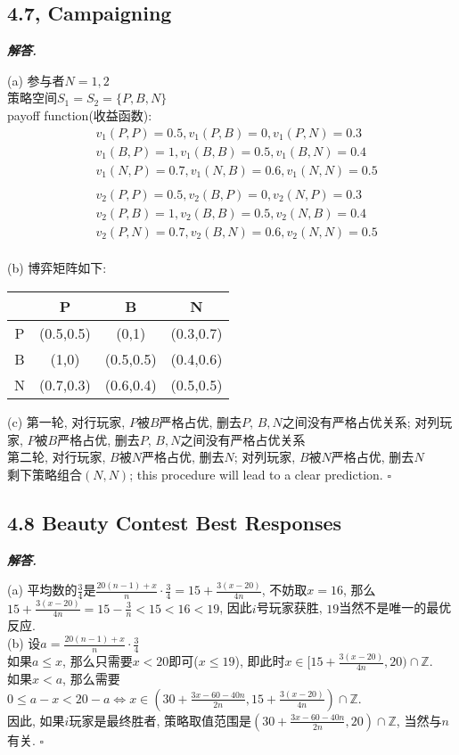 \documentclass[10pt, a4paper, oneside]{ctexart}
\newenvironment{solution}{%
  \par\noindent\textbf{\textit{解答. }}\ignorespaces
}{%
  \hfill\ensuremath{\square}\par %
}
\begin{document}
\subsection{4.7, Campaigning}

\begin{solution}
(a) 参与者$N={1,2}$\\
策略空间$S_1=S_2=\{P,B,N\}$\\
payoff function(收益函数):
\begin{align*}
    &v_1(P,P)=0.5,v_1(P,B)=0,v_1(P,N)=0.3\\
    &v_1(B,P)=1,v_1(B,B)=0.5,v_1(B,N)=0.4\\
    &v_1(N,P)=0.7,v_1(N,B)=0.6,v_1(N,N)=0.5\\\\
    &v_2(P,P)=0.5,v_2(B,P)=0,v_2(N,P)=0.3\\
    &v_2(P,B)=1,v_2(B,B)=0.5,v_2(N,B)=0.4\\
    &v_2(P,N)=0.7,v_2(B,N)=0.6,v_2(N,N)=0.5
\end{align*}
\\(b) 博弈矩阵如下:
\begin{center}
\begin{tabular}{|c|c|c|c|}
    \hline
      & P & B & N \\ \hline
    P & (0.5,0.5) & (0,1) & (0.3,0.7) \\ \hline
    B & (1,0) & (0.5,0.5) & (0.4,0.6) \\ \hline
    N & (0.7,0.3) & (0.6,0.4) & (0.5,0.5) \\ \hline
\end{tabular}
\end{center}
(c) 第一轮, 对行玩家, $P$被$B$严格占优, 删去$P$, $B,N$之间没有严格占优关系; 对列玩家, $P$被$B$严格占优, 删去$P$, $B,N$之间没有严格占优关系\\
第二轮, 对行玩家, $B$被$N$严格占优, 删去$N$; 对列玩家, $B$被$N$严格占优, 删去$N$\\
剩下策略组合$(N,N)$; this procedure will lead to a clear prediction.
\end{solution}


\subsection{4.8 Beauty Contest Best Responses}

\begin{solution}
(a) 平均数的$\frac{3}{4}$是$\frac{20(n-1)+x}{n}\cdot \frac{3}{4}=15+\frac{3(x-20)}{4n}$, 不妨取$x=16$, 那么$15+\frac{3(x-20)}{4n}=15-\frac{3}{n}<15<16<19$, 因此$i$号玩家获胜, $19$当然不是唯一的最优反应.\\
(b) 设$a=\frac{20(n-1)+x}{n}\cdot \frac{3}{4}$\\
如果$a\leq x$, 那么只需要$x<20$即可($x\leq 19$), 即此时$x\in [15+\frac{3(x-20)}{4n},20)\cap \mathbb{Z}$.\\
如果$x<a$, 那么需要$0\leq a-x<20-a\iff x\in (30+\frac{3x-60-40n}{2n}, 15+\frac{3(x-20)}{4n})\cap \mathbb{Z}$.\\
因此, 如果$i$玩家是最终胜者, 策略取值范围是$(30+\frac{3x-60-40n}{2n}, 20)\cap \mathbb{Z}$, 当然与$n$有关.
\end{solution}
\end{document}
